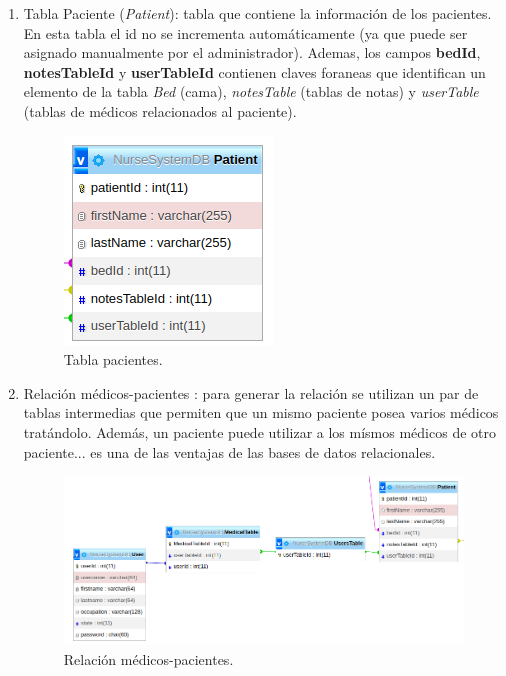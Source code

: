 \begin{enumerate}
\item Tabla Paciente (\textit{Patient}): tabla que contiene la información de los pacientes. En esta tabla el id no se incrementa automáticamente (ya que puede ser asignado manualmente por el administrador). Ademas, los campos \textbf{bedId}, \textbf{notesTableId} y \textbf{userTableId} contienen claves foraneas que identifican un elemento de la tabla \textit{Bed} (cama), \textit{notesTable} (tablas de notas) y \textit{userTable} (tablas de médicos relacionados al paciente).


\begin{figure}[ht]
	\centering
	\includegraphics[scale=.6]{./Figures/dB(patient).png}
	\caption{Tabla pacientes.}
	\label{fig:Tabla pacientes (base de datos)}
\end{figure}


\item Relación médicos-pacientes : para generar la relación se utilizan un par de tablas intermedias que permiten que un mismo paciente posea varios médicos tratándolo. Además, un paciente puede utilizar a los mísmos médicos de otro paciente... es una de las ventajas de las bases de datos relacionales.


\begin{figure}[ht]
	\centering
	\includegraphics[scale=.45]{./Figures/tabla-medicos-pacientes.png}
	\caption{Relación médicos-pacientes.}
	\label{fig:Relación médicos-pacientes (base de datos)}
\end{figure}




\end{enumerate}
